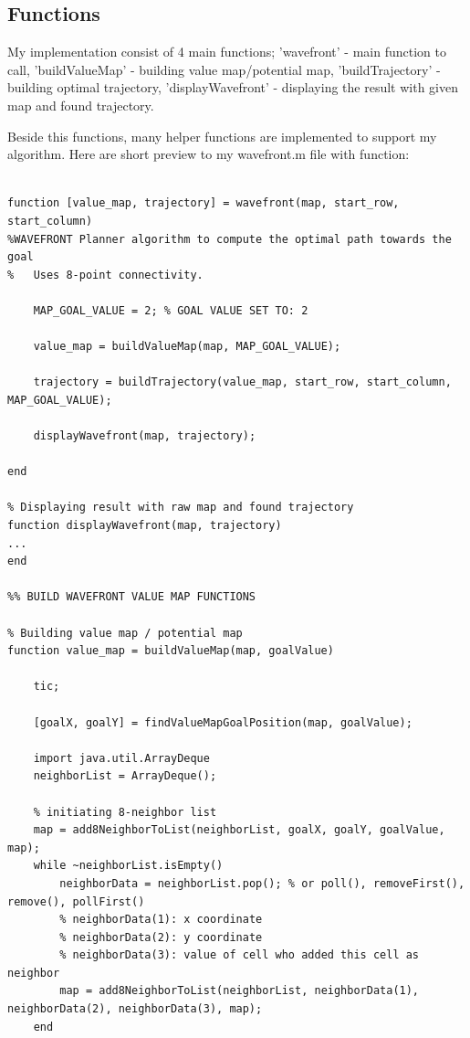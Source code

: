 \documentclass{article}
\begin{document}
	\subsection{Functions}
	My implementation consist of 4 main functions; 'wavefront' - main function to call, 'buildValueMap' - building value map/potential map, 'buildTrajectory' - building optimal trajectory, 'displayWavefront' - displaying the result with given map and found trajectory. \par
	Beside this functions, many helper functions are implemented to support my algorithm. Here are short preview to my wavefront.m file with function:
	
	\begin{lstlisting}[label=wavefront-m, caption=wavefront.m]
	
function [value_map, trajectory] = wavefront(map, start_row, start_column)
%WAVEFRONT Planner algorithm to compute the optimal path towards the goal
%   Uses 8-point connectivity.

    MAP_GOAL_VALUE = 2; % GOAL VALUE SET TO: 2
    
    value_map = buildValueMap(map, MAP_GOAL_VALUE);
    
    trajectory = buildTrajectory(value_map, start_row, start_column, MAP_GOAL_VALUE);
    
    displayWavefront(map, trajectory);

end

% Displaying result with raw map and found trajectory
function displayWavefront(map, trajectory)
...    
end

%% BUILD WAVEFRONT VALUE MAP FUNCTIONS

% Building value map / potential map
function value_map = buildValueMap(map, goalValue)

    tic;

    [goalX, goalY] = findValueMapGoalPosition(map, goalValue);

    import java.util.ArrayDeque
    neighborList = ArrayDeque();

    % initiating 8-neighbor list
    map = add8NeighborToList(neighborList, goalX, goalY, goalValue, map);
    while ~neighborList.isEmpty()
        neighborData = neighborList.pop(); % or poll(), removeFirst(), remove(), pollFirst()
        % neighborData(1): x coordinate
        % neighborData(2): y coordinate
        % neighborData(3): value of cell who added this cell as neighbor
        map = add8NeighborToList(neighborList, neighborData(1), neighborData(2), neighborData(3), map);
    end
    

\end{lstlisting}
\end{document}
